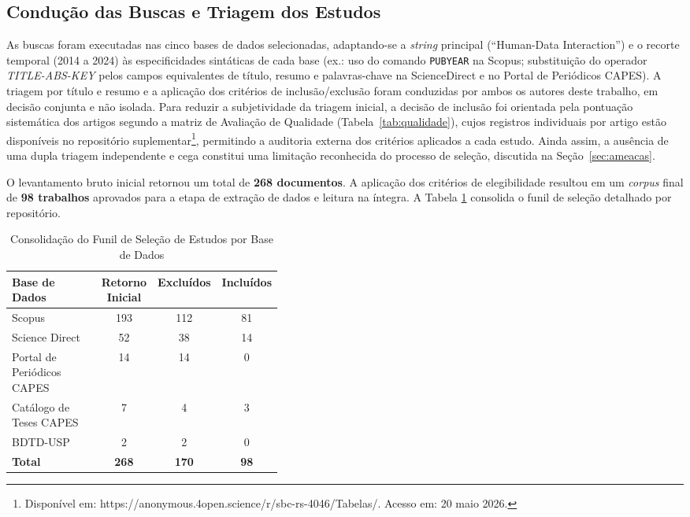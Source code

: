 \documentclass[12pt]{article}
\begin{document}
\subsection{Condução das Buscas e Triagem dos Estudos}

As buscas foram executadas nas cinco bases de dados selecionadas, adaptando-se a \textit{string} principal (``Human-Data Interaction'') e o recorte temporal (2014 a 2024) às especificidades sintáticas de cada base (ex.: uso do comando \texttt{PUBYEAR} na Scopus; substituição do operador \textit{TITLE-ABS-KEY} pelos campos equivalentes de título, resumo e palavras-chave na ScienceDirect e no Portal de Periódicos CAPES). A triagem por título e resumo e a aplicação dos critérios de inclusão/exclusão foram conduzidas por ambos os autores deste trabalho, em decisão conjunta e não isolada. Para reduzir a subjetividade da triagem inicial, a decisão de inclusão foi orientada pela pontuação sistemática dos artigos segundo a matriz de Avaliação de Qualidade (Tabela~\ref{tab:qualidade}), cujos registros individuais por artigo estão disponíveis no repositório suplementar\footnote{Disponível em: https://anonymous.4open.science/r/sbc-rs-4046/Tabelas/. Acesso em: 20 maio 2026.}, permitindo a auditoria externa dos critérios aplicados a cada estudo. Ainda assim, a ausência de uma dupla triagem independente e cega constitui uma limitação reconhecida do processo de seleção, discutida na Seção~\ref{sec:ameacas}.

O levantamento bruto inicial retornou um total de \textbf{268 documentos}. A aplicação dos critérios de elegibilidade resultou em um \textit{corpus} final de \textbf{98 trabalhos} aprovados para a etapa de extração de dados e leitura na íntegra. A Tabela \ref{tab:funil_selecao} consolida o funil de seleção detalhado por repositório.

\begin{table}[H]
\centering
\caption{Consolidação do Funil de Seleção de Estudos por Base de Dados}
\label{tab:funil_selecao}
\small
\begin{tabular}{p{0.40\linewidth} c c c}
\hline
\textbf{Base de Dados} & \textbf{Retorno Inicial} & \textbf{Excluídos} & \textbf{Incluídos} \\ \hline
Scopus & 193 & 112 & 81 \\
Science Direct & 52 & 38 & 14 \\
Portal de Periódicos CAPES & 14 & 14 & 0 \\
Catálogo de Teses CAPES & 7 & 4 & 3 \\
BDTD-USP & 2 & 2 & 0 \\ \hline
\textbf{Total} & \textbf{268} & \textbf{170} & \textbf{98} \\ \hline
\end{tabular}
\end{table}
\vspace{-0.1 cm} 
\end{document}

